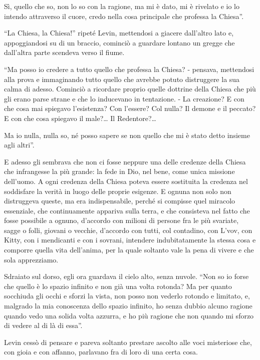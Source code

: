 Sì, quello che so, non lo so con la ragione, ma mi è dato, mi è rivelato e io lo intendo attraverso il cuore, credo nella cosa principale che professa la Chiesa''. 

``La Chiesa, la Chiesa!'' ripeté Levin, mettendosi a giacere dall'altro lato e, appoggiandosi su di un braccio, cominciò a guardare lontano un gregge che dall'altra parte scendeva verso il fiume. 

``Ma posso io credere a tutto quello che professa la Chiesa? - pensava, mettendosi alla prova e immaginando tutto quello che avrebbe potuto distruggere la sua calma di adesso. Cominciò a ricordare proprio quelle dottrine della Chiesa che più gli erano parse strane e che lo inducevano in tentazione. - La creazione? E con che cosa mai spiegavo l'esistenza? Con l'essere? Col nulla? Il demone e il peccato? E con che cosa spiegavo il male?\ldots{} Il Redentore?\ldots{} 

Ma io nulla, nulla so, né posso sapere se non quello che mi è stato detto insieme agli altri''. 

E adesso gli sembrava che non ci fosse neppure una delle credenze della Chiesa che infrangesse la più grande: la fede in Dio, nel bene, come unica missione dell'uomo. A ogni credenza della Chiesa poteva essere sostituita la credenza nel soddisfare la verità in luogo delle proprie esigenze. E ognuna non solo non distruggeva queste, ma era indispensabile, perché si compisse quel miracolo essenziale, che continuamente appariva sulla terra, e che consisteva nel fatto che fosse possibile a ognuno, d'accordo con milioni di persone fra le più svariate, sagge o folli, giovani o vecchie, d'accordo con tutti, col contadino, con L'vov, con Kitty, con i mendicanti e con i sovrani, intendere indubitatamente la stessa cosa e comporre quella vita dell'anima, per la quale soltanto vale la pena di vivere e che sola apprezziamo. 

Sdraiato sul dorso, egli ora guardava il cielo alto, senza nuvole. ``Non so io forse che quello è lo spazio infinito e non già una volta rotonda? Ma per quanto socchiuda gli occhi e sforzi la vista, non posso non vederlo rotondo e limitato, e, malgrado la mia conoscenza dello spazio infinito, ho senza dubbio alcuno ragione quando vedo una solida volta azzurra, e ho più ragione che non quando mi sforzo di vedere al di là di essa''. 

Levin cessò di pensare e pareva soltanto prestare ascolto alle voci misteriose che, con gioia e con affanno, parlavano fra di loro di una certa cosa. 

